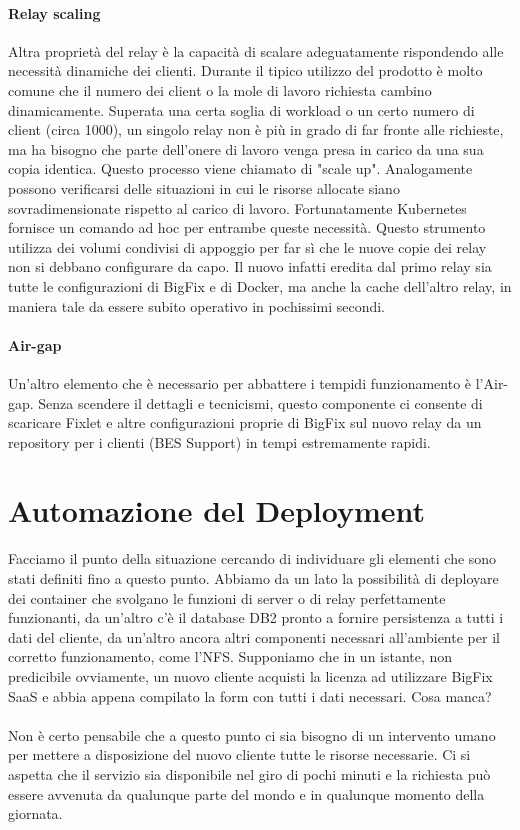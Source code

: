 \paragraph{Relay scaling}
Altra proprietà del relay è la capacità di scalare adeguatamente rispondendo alle necessità dinamiche dei clienti. Durante il tipico utilizzo del prodotto è molto comune che il numero dei client o la mole di lavoro richiesta cambino dinamicamente. Superata una certa soglia di workload o un certo numero di client (circa 1000), un singolo relay non è più in grado di far fronte alle richieste, ma ha bisogno che parte dell'onere di lavoro venga presa in carico da una sua copia identica. Questo processo viene chiamato di "scale up". Analogamente possono verificarsi delle situazioni in cui le risorse allocate siano sovradimensionate rispetto al carico di lavoro. Fortunatamente Kubernetes fornisce un comando ad hoc per entrambe queste necessità. Questo strumento utilizza dei volumi condivisi di appoggio per far sì che le nuove copie dei relay non si debbano configurare da capo. Il nuovo infatti eredita dal primo relay sia tutte le configurazioni di BigFix e di Docker, ma anche la cache dell'altro relay, in maniera tale da essere subito operativo in pochissimi secondi. 
\paragraph{Air-gap}
Un'altro elemento che è necessario per abbattere i tempidi funzionamento è l'Air-gap. Senza scendere il dettagli e tecnicismi, questo componente ci consente di scaricare Fixlet e altre configurazioni proprie di BigFix sul nuovo relay da un repository per i clienti (BES Support) in tempi estremamente rapidi. 
\section{Automazione del Deployment}
Facciamo il punto della situazione cercando di individuare gli elementi che sono stati definiti fino a questo punto. Abbiamo da un lato la possibilità di deployare dei container che svolgano le funzioni di server o di relay perfettamente funzionanti, da un'altro c'è il database DB2 pronto a fornire persistenza a tutti i dati del cliente, da un'altro ancora altri componenti necessari all'ambiente per il corretto funzionamento, come l'NFS. Supponiamo che in un istante, non predicibile ovviamente, un nuovo cliente acquisti la licenza ad utilizzare BigFix SaaS e abbia appena compilato la form con tutti i dati necessari. Cosa manca? 
\paragraph{}
Non è certo pensabile che a questo punto ci sia bisogno di un intervento umano per mettere a disposizione del nuovo cliente tutte le risorse necessarie. Ci si aspetta che il servizio sia disponibile nel giro di pochi minuti e la richiesta può essere avvenuta da qualunque parte del mondo e in qualunque momento della giornata.
